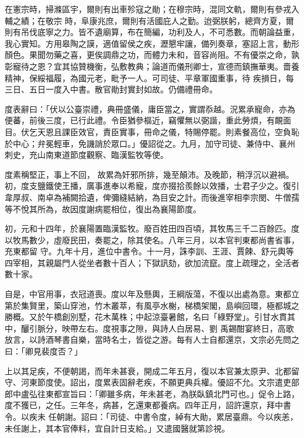 \begin{pinyinscope}
 在憲宗時，掃滌區宇，爾則有出車殄寇之勛；在穆宗時，混同文軌，爾則有參戎入輔之績；在敬宗
 時，阜康兆庶，爾則有活國庇人之勤。迨弼朕躬，總齊方夏，爾則有吊伐底寧之力。皆不遺廟算，布在簡編，功利及人，不可悉數。而朝論益重，我心實知。方用皋陶之謨，適值留侯之疾，瀝懇牢讓，備列奏章，塞詔上言，動形顏色。果聞勿藥之喜，更俟調鼎之功，而體力未和，音容尚阻。不有優崇之命，孰彰寵待之恩？宜其協贊機衡，弘敷教典；論道而儀刑卿士，宣德而鎮撫華夷。嗇養精神，保綏福履，為國元老，毗予一人。可司徒、平章軍國重事，待
 疾損日，每三日、五日一度入中書。散官勛封實封如故。仍備禮冊命。



 度表辭曰：「伏以公臺崇禮，典冊盛儀，庸臣當之，實謂忝越。況累承寵命，亦為便蕃，前後三度，已行此禮。令臣猶參樞近，竊懼無以弼諧，重此勞煩，有靦面目。伏乞天恩且課臣效官，責臣實事，冊命之儀，特賜停罷。則素餐高位，空負恥於中心；弁冕輕車，免譏誚於眾口。」優詔從之。九月，加守司徒、兼侍中、襄州刺史，充山南東道節度觀察、臨漢監牧等使。



 度素稱堅正，事上不回，
 故累為奸邪所排，幾至顛沛。及晚節，稍浮沉以避禍。初，度支鹽鐵使王播，廣事進奉以希寵，度亦掇拾羨餘以效播，士君子少之。復引韋厚叔、南卓為補闕拾遺，俾彌縫結納，為目安之計。而後進宰相李宗閔、牛僧孺等不悅其所為，故因度謝病罷相位，復出為襄陽節度。



 初，元和十四年，於襄陽置臨漢監牧。廢百姓田四百頃，其牧馬三千二百餘匹。度以牧馬數少，虛廢民田，奏罷之，除其使名。八年三月，以本官判東都尚書省事，充東都留
 守。九年十月，進位中書令。十一月，誅李訓、王涯、賈餗、舒元輿等四宰相，其親屬門人從坐者數十百人；下獄訊劾，欲加流竄。度上疏理之，全活者數十家。



 自是，中官用事，衣冠道喪。度以年及懸輿，王綱版蕩，不復以出處為意。東都立第於集賢里，築山穿池，竹木叢萃，有風亭水榭，梯橋架閣，島嶼回環，極都城之勝概。又於午橋創別墅，花木萬株；中起涼臺暑館，名曰「綠野堂」。引甘水貫其中，釃引脈分，映帶左右。度視事之隙，與詩人白居易、劉
 禹錫酣宴終日，高歌放言，以詩酒琴書自樂，當時名士，皆從之游。每有人士自都還京，文宗必先問之曰：「卿見裴度否？」



 上以其足疾，不便朝謁，而年未甚衰，開成二年五月，復以本官兼太原尹、北都留守、河東節度使。詔出，度累表固辭老疾，不願更典兵權。優詔不允。文宗遣吏部郎中盧弘往東都宣旨曰：「卿雖多病，年未甚老，為朕臥鎮北門可也。」促令上路，度不獲已，之任。三年冬，病甚，乞還東都養病。四年正月，詔許還京，拜中書令。以疾未
 任朝謝。詔曰：「司徒、中書令度，綽有大勛，累居臺鼎。今以疾恙，未任謝上，其本官俸料，宜自計日支給。」又遣國醫就第診視。




\end{pinyinscope}
